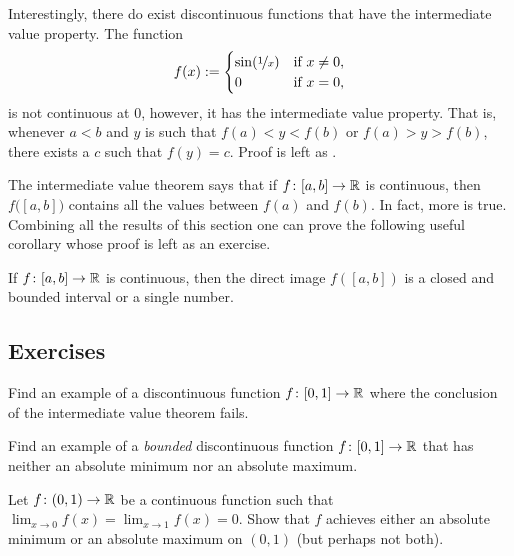 \begin{example}
Interestingly,
there do exist discontinuous functions that have
the intermediate value property.
The function
\begin{equation*}
f(x) :=
\begin{cases}
\sin(\nicefrac{1}{x}) & \text{if } x \not= 0, \\
0 & \text{if } x=0,
\end{cases}
\end{equation*}
is not continuous at 0, however, it has the intermediate value property.
That is, whenever $a < b$ and $y$ is such that $f(a) < y < f(b)$
or $f(a) > y > f(b)$,
there exists a $c$ such that $f(y) = c$.
Proof is left as .
\end{example}

The intermediate value theorem says that if $f \colon [a,b] \to {\mathbb{R}}$ is
continuous, then $f\bigl([a,b]\bigr)$ contains all the values between $f(a)$ and
$f(b)$.  In fact, more is true.  Combining all the results of this section
one can prove the following useful corollary whose proof is left as an exercise.

\begin{cor} \label{cor:imageofinterval}
If $f \colon [a,b] \to {\mathbb{R}}$ is continuous, then the direct image $f([a,b])$
is a closed and bounded interval or a single number.
\end{cor}

\subsection{Exercises}

\begin{exercise}
Find an example of a discontinuous function $f \colon [0,1] \to {\mathbb{R}}$
where the conclusion of the intermediate value theorem fails.
\end{exercise}

\begin{exercise}
Find an example of a \emph{bounded} discontinuous function $f \colon [0,1]
\to {\mathbb{R}}$ that has neither an absolute minimum nor an absolute maximum.
\end{exercise}

\begin{exercise}
Let $f \colon (0,1) \to {\mathbb{R}}$ be a continuous function such that
$\displaystyle \lim_{x\to 0} f(x) =
\displaystyle \lim_{x\to 1} f(x) = 0$.  Show that
$f$ achieves either an absolute minimum or an absolute maximum on $(0,1)$
(but perhaps not both).
\end{exercise}

